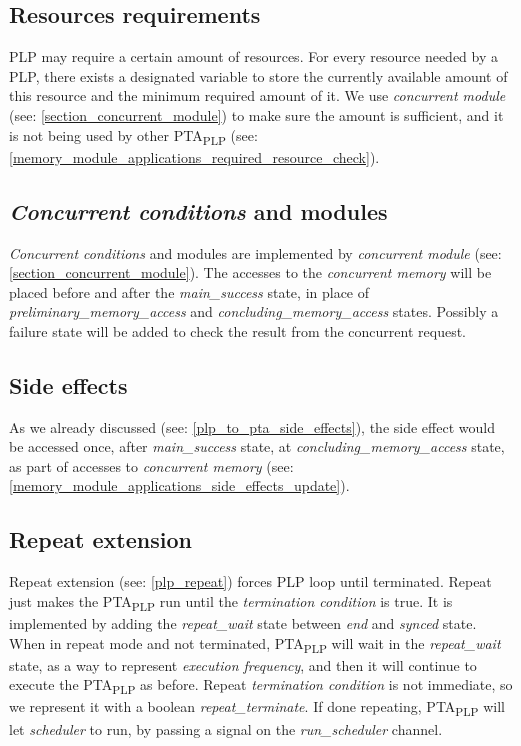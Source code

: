 \subsection{Resources requirements \label{pta_achieve_resources_requirements}}
PLP may require a certain amount of resources. For every resource needed by a PLP, there exists a designated variable to store the currently available amount of this resource and the minimum required amount of it. We use \textit{concurrent module} (see: \ref{section_concurrent_module}) to make sure the amount is sufficient, and it is not being used by other PTA\textsubscript{PLP} (see: \ref{memory_module_applications_required_resource_check}).\\
\subsection{\textit{Concurrent conditions} and modules \label{pta_achieve_concurrent_conditions_and_modules}}
\textit{Concurrent conditions} and modules are implemented by \textit{concurrent module}  (see: \ref{section_concurrent_module}). The accesses to the \textit{concurrent memory} will be placed before and after the \textcolor{ColorUppaalState}{\textit{main_success}} state, in place of \textcolor{ColorUppaalState}{\textit{preliminary_memory_access}} and \textcolor{ColorUppaalState}{\textit{concluding_memory_access}} states. Possibly a failure state will be added to check the result from the concurrent request.\\
\subsection{Side effects \label{pta_achieve_side_effects}}
As we already discussed (see: \ref{plp_to_pta_side_effects}), the side effect would be accessed once, after \textcolor{ColorUppaalState}{\textit{main_success}} state, at \textcolor{ColorUppaalState}{\textit{concluding_memory_access}} state, as part of accesses to \textit{concurrent memory} (see: \ref{memory_module_applications_side_effects_update}).\\
\subsection{Repeat extension \label{pta_achieve_repeat_extension}}
Repeat extension (see: \ref{plp_repeat}) forces PLP loop until terminated. Repeat just makes the PTA\textsubscript{PLP} run until the \textit{termination condition} is true. It is implemented by adding the \textcolor{ColorUppaalState}{\textit{repeat_wait}} state between \textcolor{ColorUppaalState}{\textit{end}} and \textcolor{ColorUppaalState}{\textit{synced}} state. When in repeat mode and not terminated, PTA\textsubscript{PLP} will wait in the \textcolor{ColorUppaalState}{\textit{repeat_wait}} state, as a way to represent \textit{execution frequency}, and then it will continue to execute the PTA\textsubscript{PLP} as before. Repeat \textit{termination condition} is not immediate, so we represent it with a boolean \textcolor{ColorEdgeGuard}{\textit{repeat_terminate}}. If done repeating, PTA\textsubscript{PLP} will let\textit{ scheduler }to run, by passing a signal on the \textcolor{ColorUppaalChannel}{\textit{run_scheduler}} channel.\\
\clearpage

